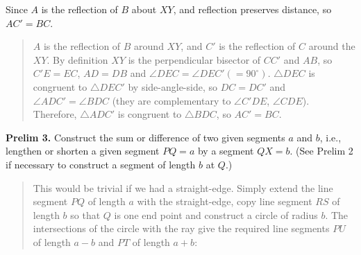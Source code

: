Since $A$ is the reflection of $B$ about $XY$, and reflection preserves distance, so $AC'=BC$.

\begin{quote}
$A$ is the reflection of $B$ around $XY$, and $C'$ is the reflection of $C$ around the $XY$. By definition $XY$ is the perpendicular bisector of $CC'$ and $AB$, so $C'E=EC$, $AD=DB$ and $\angle DEC=\angle DEC'(=90^\circ)$. $\triangle DEC$ is congruent to $\triangle DEC'$ by side-angle-side, so $DC=DC'$ and $\angle ADC'=\angle BDC$ (they are complementary to $\angle C'DE$, $\angle CDE$). Therefore, $\triangle ADC'$ is congruent to $\triangle BDC$, so $AC'=BC$.
\end{quote}


\textbf{Prelim 3.} Construct the sum or difference of two given segments $a$ and $b$, i.e., lengthen or shorten a given segment $PQ = a$ by a segment $QX = b$. (See Prelim 2 if necessary to construct a segment of length $b$ at $Q$.)

\begin{quote}
This would be trivial if we had a straight-edge. Simply extend the line segment $PQ$ of length $a$ with the straight-edge, copy line segment $RS$ of length $b$ so that $Q$ is one end point and construct a circle of radius $b$. The intersections of the circle with the ray give the required line segments $PU$ of length $a-b$ and $PT$ of length $a+b$:
\begin{center}
\vspace*{-2ex}
\end{center}
\vspace*{-4ex}
\end{quote}

